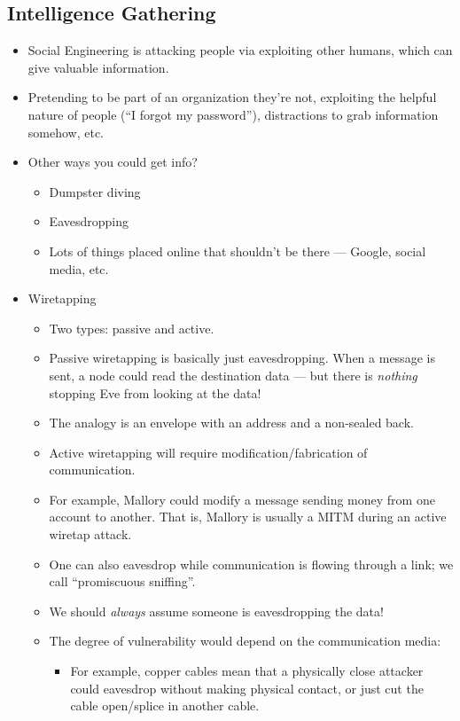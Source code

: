 \documentclass{article}
\begin{document}
\subsection{Intelligence Gathering}
\begin{itemize}
    \item Social Engineering is attacking people via exploiting other humans, which can give valuable information.
    \item Pretending to be part of an organization they're not, exploiting the helpful nature of people (``I forgot my password''), distractions to grab information somehow, etc.
    \item Other ways you could get info?
        \begin{itemize}
            \item Dumpster diving
            \item Eavesdropping
            \item Lots of things placed online that shouldn't be there --- Google, social media, etc.
        \end{itemize}
    \item Wiretapping
        \begin{itemize}
            \item Two types: passive and active.
            \item Passive wiretapping is basically just eavesdropping.  When a message is sent, a node could read the destination data --- but there is \emph{nothing} stopping Eve from looking at the data!
            \item The analogy is an envelope with an address and a non-sealed back.
            \item Active wiretapping will require modification/fabrication of communication.
            \item For example, Mallory could modify a message sending money from one account to another.  That is, Mallory is usually a MITM during an active wiretap attack.
            \item One can also eavesdrop while communication is flowing through a link; we call ``promiscuous sniffing''.
            \item We should \emph{always} assume someone is eavesdropping the data!
            \item The degree of vulnerability would depend on the communication media:
                \begin{itemize}
                    \item For example, copper cables mean that a physically close attacker could eavesdrop without making physical contact, or just cut the cable open/splice in another cable.

\end{itemize}
\end{itemize}
\end{itemize}
\end{document}
